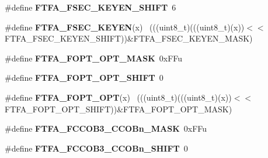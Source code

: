 \begin{DoxyCompactItemize}
\item 
\hypertarget{group___f_t_f_a___register___masks_gab067e78749f412c158925484b07400c0}{}\#define {\bfseries F\+T\+F\+A\+\_\+\+F\+S\+E\+C\+\_\+\+K\+E\+Y\+E\+N\+\_\+\+S\+H\+I\+F\+T}~6\label{group___f_t_f_a___register___masks_gab067e78749f412c158925484b07400c0}

\item 
\hypertarget{group___f_t_f_a___register___masks_ga538f4f67a41b40eefc209f0aa3ceecb2}{}\#define {\bfseries F\+T\+F\+A\+\_\+\+F\+S\+E\+C\+\_\+\+K\+E\+Y\+E\+N}(x)                                          ~(((uint8\+\_\+t)(((uint8\+\_\+t)(x))$<$$<$F\+T\+F\+A\+\_\+\+F\+S\+E\+C\+\_\+\+K\+E\+Y\+E\+N\+\_\+\+S\+H\+I\+F\+T))\&F\+T\+F\+A\+\_\+\+F\+S\+E\+C\+\_\+\+K\+E\+Y\+E\+N\+\_\+\+M\+A\+S\+K)\label{group___f_t_f_a___register___masks_ga538f4f67a41b40eefc209f0aa3ceecb2}

\item 
\hypertarget{group___f_t_f_a___register___masks_ga779df0be2be88c60f0c9e8e98850d479}{}\#define {\bfseries F\+T\+F\+A\+\_\+\+F\+O\+P\+T\+\_\+\+O\+P\+T\+\_\+\+M\+A\+S\+K}~0x\+F\+Fu\label{group___f_t_f_a___register___masks_ga779df0be2be88c60f0c9e8e98850d479}

\item 
\hypertarget{group___f_t_f_a___register___masks_ga89bbb59793ccc7cb270b4a285c73062f}{}\#define {\bfseries F\+T\+F\+A\+\_\+\+F\+O\+P\+T\+\_\+\+O\+P\+T\+\_\+\+S\+H\+I\+F\+T}~0\label{group___f_t_f_a___register___masks_ga89bbb59793ccc7cb270b4a285c73062f}

\item 
\hypertarget{group___f_t_f_a___register___masks_ga3a5d86efa7984278bc9ae5e063415192}{}\#define {\bfseries F\+T\+F\+A\+\_\+\+F\+O\+P\+T\+\_\+\+O\+P\+T}(x)                                              ~(((uint8\+\_\+t)(((uint8\+\_\+t)(x))$<$$<$F\+T\+F\+A\+\_\+\+F\+O\+P\+T\+\_\+\+O\+P\+T\+\_\+\+S\+H\+I\+F\+T))\&F\+T\+F\+A\+\_\+\+F\+O\+P\+T\+\_\+\+O\+P\+T\+\_\+\+M\+A\+S\+K)\label{group___f_t_f_a___register___masks_ga3a5d86efa7984278bc9ae5e063415192}

\item 
\hypertarget{group___f_t_f_a___register___masks_gae1057e6e0ff5441696b4246e99fbd33f}{}\#define {\bfseries F\+T\+F\+A\+\_\+\+F\+C\+C\+O\+B3\+\_\+\+C\+C\+O\+Bn\+\_\+\+M\+A\+S\+K}~0x\+F\+Fu\label{group___f_t_f_a___register___masks_gae1057e6e0ff5441696b4246e99fbd33f}

\item 
\hypertarget{group___f_t_f_a___register___masks_ga0ee905ea83a52a6a22d12666387f266b}{}\#define {\bfseries F\+T\+F\+A\+\_\+\+F\+C\+C\+O\+B3\+\_\+\+C\+C\+O\+Bn\+\_\+\+S\+H\+I\+F\+T}~0\label{group___f_t_f_a___register___masks_ga0ee905ea83a52a6a22d12666387f266b}


\end{DoxyCompactItemize}
